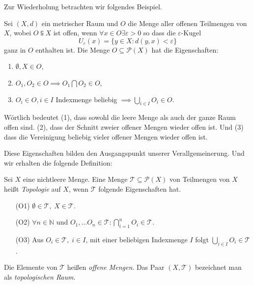 Zur Wiederholung betrachten wir folgendes Beispiel. 

{
    Sei $(X,d)$ ein metrischer Raum und $O$ die Menge aller offenen Teilmengen von $X$,
    wobei $O \subseteqq X$ ist offen, wenn $\forall x \in O \exists \varepsilon > 0$ so dass die $\varepsilon$-Kugel
    $$
        U_\varepsilon(x) = \{ y \in X : d(y,x) < \varepsilon \}
    $$
    ganz in $O$ enthalten ist. 
    Die Menge $O \subseteq \mathcal{P}(X)$ hat die Eigenschaften:
    \begin{enumerate}
        \item $\emptyset, X \in O$,
        \item $O_1, O_2 \in O \implies O_1 \bigcap O_2 \in O$,
        \item $O_i \in O, i \in I$ Indexmenge beliebig $\implies \bigcup_{i \in I} O_i \in O$.
    \end{enumerate}
    Wörtlich bedeutet (1), dass sowohl die leere Menge als auch der ganze Raum
    offen sind. (2), dass der Schnitt zweier offener Mengen wieder offen ist.
    Und (3) dass die Vereinigung beliebig vieler offener Mengen wieder offen ist.
}

Diese Eigenschaften bilden den Ausgangspunkt unserer Verallgemeinerung. Und wir erhalten die folgende Definition:


{
    Sei $X$ eine nichtleere Menge. Eine Menge $\mathcal{T} \subseteq \mathcal{P}(X)$ von Teilmengen 
von $X$ heißt \emph{Topologie} auf $X$, wenn $\mathcal{T}$ folgende Eigenschaften hat.
\begin{itemize}
    \item[(O1)] $\emptyset \in \mathcal{T}, \; X \in \mathcal{T}$.
    \item[(O2)] $\forall n \in \mathbb{N} \text{ und } O_1, \dots O_n \in \mathcal{T} : 
     \bigcap_{i=1}^{n} O_i \in \mathcal{T}$.
    \item[(O3)] Aus $O_i \in \mathcal{T}, \; i \in I$, mit einer beliebigen Indexmenge $I$ folgt 
    $\bigcup_{i \in I} O_i \in \mathcal{T}$.
\end{itemize}
Die Elemente von $\mathcal{T}$ heißen \emph{offene Mengen}. Das Paar $(X, \mathcal{T})$ 
bezeichnet man als \emph{topologischen Raum}.
}

